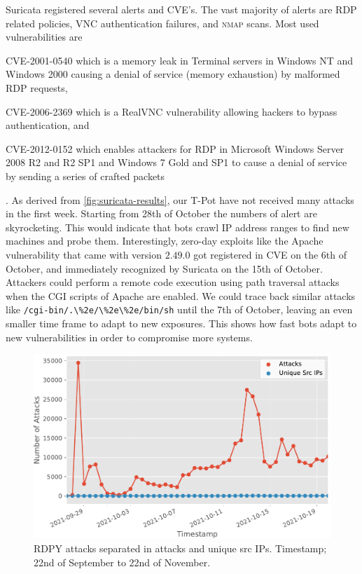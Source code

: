 Suricata registered several alerts and CVE's.
The vast majority of alerts are RDP related policies, VNC authentication failures, and \textsc{nmap} scans.
Most used vulnerabilities are
\begin{enumerate*}[label=(\roman*)]
    \item CVE-2001-0540\cite{CVE-2001-0540} which is a memory leak in Terminal servers in Windows NT and Windows 2000 causing a denial of service (memory exhaustion) by malformed RDP requests,
    \item CVE-2006-2369\cite{CVE-2006-2369} which is a RealVNC vulnerability allowing hackers to bypass authentication, and
    \item CVE-2012-0152\cite{CVE-2012-0152} which enables attackers for RDP in Microsoft Windows Server 2008 R2 and R2 SP1 and Windows 7 Gold and SP1 to cause a denial of service by sending a series of crafted packets
\end{enumerate*}.
As derived from \autoref{fig:suricata-results}, our T-Pot have not received many attacks in the first week.
Starting from 28th of October the numbers of alert are skyrocketing.
This would indicate that bots crawl IP address ranges to find new machines and probe them.
Interestingly, zero-day exploits like the Apache vulnerability \cite{CVE-2021-42013} that came with version $2.49.0$ got registered in CVE on the 6th of October, and immediately recognized by Suricata on the 15th of October.
Attackers could perform a remote code execution using path traversal attacks when the CGI scripts of Apache are enabled.
We could trace back similar attacks like \verb|/cgi-bin/.\%2e/\%2e\%2e/bin/sh| until the 7th of October, leaving an even smaller time frame to adapt to new exposures.
This shows how fast bots adapt to new vulnerabilities in order to compromise more systems.

\begin{figure}[ht]
    \centering
    \includegraphics[width=\textwidth]{figures/tpot-rdpy-port.pdf}
    \caption[RDPY results of T-Pot]{RDPY attacks separated in attacks and unique src IPs. Timestamp; 22nd of September to 22nd of November.}
    \label{fig:rdpy-results}
\end{figure}

